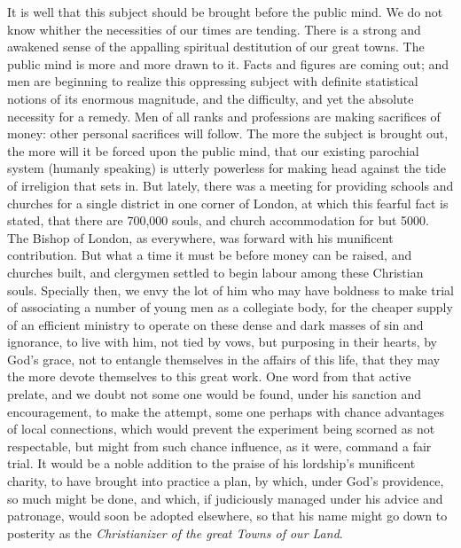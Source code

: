 It is well that this subject should be brought
before the public mind. We do not know whither the necessities of our
times are tending. There is a strong and awakened sense of the appalling
spiritual destitution of our great towns. The public mind is more and
more drawn to it. Facts and figures are coming out; and men are
beginning to realize this oppressing subject with definite
statistical notions of its enormous magnitude, and the difficulty, and
yet the absolute necessity for a remedy. Men of all ranks and
professions are making sacrifices of money: other personal sacrifices
will follow. The more the subject is brought out, the more will it be
forced upon the public mind, that our existing parochial system (humanly
speaking) is utterly powerless for making head against the tide of
irreligion that sets in. But lately, there was a meeting for providing
schools and churches for a single district in one corner of London, at
which this fearful fact is stated, that there are 700,000 souls, and
church accommodation for but 5000. The Bishop of London, as everywhere,
was forward with his munificent contribution. But what a time it must be
before money can be raised, and churches built, and clergymen settled to
begin labour among these Christian souls. Specially then, we envy the
lot of him who may have boldness to make trial of associating a number
of young men as a collegiate body, for the cheaper supply of an
efficient ministry to operate on these dense and dark masses of sin and
ignorance, to live with him, not tied by vows, but purposing in their
hearts, by God's grace, not to entangle themselves in the affairs of
this life, that they may the more devote themselves to this great work.
One word from that active prelate, and we doubt not some one would be
found, under his sanction and encouragement, to make the attempt, some
one perhaps with chance advantages of local connections, which would
prevent the experiment being scorned as not respectable, but might from
such chance influence, as it were, command a fair trial. It would be a
noble addition to the praise of his lordship's munificent charity, to
have brought into practice a plan, by which, under God's providence, so
much might be done, and which, if judiciously managed under his advice
and patronage, would soon be adopted elsewhere, so that his name might
go down to posterity as the \emph{Christianizer of the great Towns of our
Land}.


